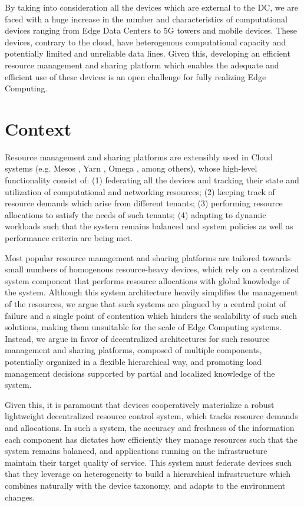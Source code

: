 By taking into consideration all the devices which are external to the DC, we are faced with a huge increase in the number and characteristics of computational devices ranging from Edge Data Centers to 5G towers and mobile devices. These devices, contrary to the cloud, have heterogenous computational capacity and potentially limited and unreliable data lines. Given this, developing an efficient resource management and sharing platform which enables the adequate and efficient use of these devices is an open challenge for fully realizing Edge Computing.

\section{Context}

Resource management and sharing platforms are extensibly used in Cloud systems (e.g. Mesos \cite{hindman2011mesos}, Yarn \cite{Vavilapalli2013ApacheHY}, Omega \cite{41684}, among others), whose high-level functionality consist of: (1) federating all the devices and tracking their state and utilization of computational and networking resources; (2) keeping track of resource demands which arise from different tenants; (3) performing resource allocations to satisfy the needs of such tenants; (4) adapting to dynamic workloads such that the system remains balanced and system policies as well as performance criteria are being met.

Most popular resource management and sharing platforms are tailored towards small numbers of homogenous resource-heavy devices, which rely on a centralized system component that performs resource allocations with global knowledge of the system. Although this system architecture heavily simplifies the management of the resources, we argue that such systems are plagued by a central point of failure and a single point of contention which hinders the scalability of such such solutions, making them unsuitable for the scale of Edge Computing systems. Instead, we argue in favor of decentralized architectures for such resource management and sharing platforms, composed of multiple components, potentially organized in a flexible hierarchical way, and promoting load management decisions supported by partial and localized knowledge of the system.

Given this, it is paramount that devices cooperatively materialize a robust lightweight decentralized resource control system, which tracks resource demands and allocations. In such a system, the accuracy and freshness of the information each component has dictates how efficiently they manage resources such that the system remains balanced, and applications running on the infrastructure maintain their target quality of service. This system must federate devices such that they leverage on heterogeneity to build a hierarchical infrastructure which combines naturally with the device taxonomy, and adapts to the environment changes.

